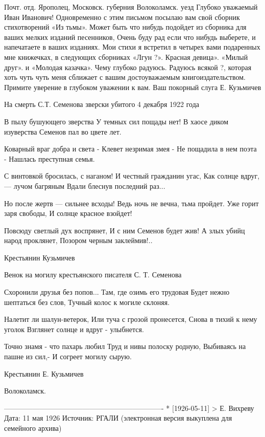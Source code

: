 \documentclass[]{memoir}
\begin{document}
Почт. отд. Ярополец, Московск. губерния Волоколамск. уезд
Глубоко уважаемый Иван Иванович!
Одновременно с этим письмом посылаю вам свой сборник стихотворений «Из тьмы». Может быть что нибудь подойдет из сборника для ваших мелких изданий песенников, Очень буду рад если что нибудь выберете, и напечатаете в ваших изданиях.
Мои стихи я встретил в четырех вами подаренных мне книжечках, в следующих сборниках «Лгун ?». Красная девица». «Милый друг». и «Молодая казачка». Чему глубоко радуюсь.  Радуюсь всякой  ?, которая хоть чуть чуть меня сближает с вашим достоуважаемым книгоиздательством.
Примите уверение в глубоком уважении к вам.
Ваш покорный слуга Е. Кузьмичев



На смерть С.Т. Семенова
зверски убитого 4 декабря 1922 года

В пылу бушующего зверства
  У темных сил пощады нет!
В хаосе диком изуверства
  Семенов пал во цвете лет.

Коварный враг добра и света -
  Клевет незримая змея -
Не пощадила в нем поэта -
  Нашлась преступная семья.

С винтовкой бросилась, с наганом!
  И честный гражданин угас,
Как солнце вдруг, — лучом багряным
  Вдали блеснув последний раз...

Но после жертв — сильнее всходы!
  Ведь ночь не вечна, тьма пройдет.
Уже горит заря свободы,
  И солнце красное взойдет!

Повсюду светлый дух воспрянет,
  И с ним Семенов будет жив!
А злых убийц народ проклянет,
  Позором черным заклеймив!..

Крестьянин Кузьмичев





Венок на могилу
крестьянского писателя
С. Т. Семенова     

Схоронили друзья без попов...
  Там, где озимь его трудовая
Будет нежно шептаться без слов,
  Тучный колос к могиле склоняя.

Налетит ли шалун-ветерок,
  Или туча с грозой пронесется,
Снова в тихий к нему уголок
  Взглянет солнце и вдруг - улыбнется.

Точно знамя - что пахарь любил
  Труд и нивы полоску родную,
Выбиваясь на пашне из сил,-
  И согреет могилу сырую.                 

  Крестьянин Е. Кузьмичев
  
  Волоколамск.

-------------------------------------------------------------------
* [1926-05-11] > Е. Вихреву 
Дата: 11 мая 1926
Источник: РГАЛИ
(электронная версия выкуплена для семейного архива)
\end{document}
